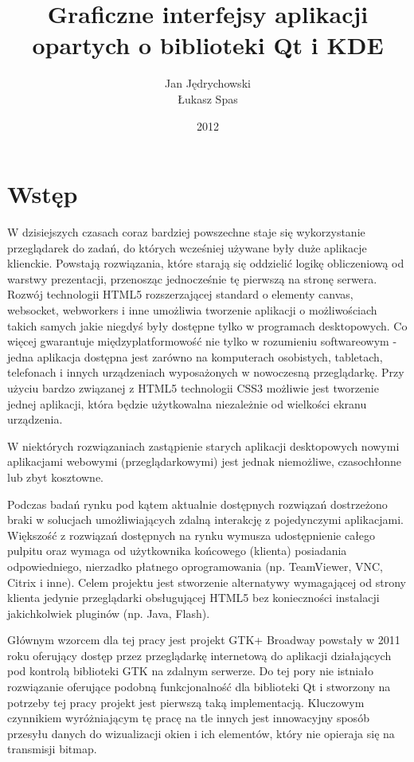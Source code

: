 \documentclass[polish]{inz}
\title{Graficzne interfejsy aplikacji opartych o biblioteki Qt i KDE}
\author{Jan J\k{e}drychowski\\\L{}ukasz Spas}
\date{2012}
\begin{document}
\maketitle

\chapter{Wstęp}

W dzisiejszych czasach coraz bardziej powszechne staje się wykorzystanie przeglądarek do zadań, do których wcześniej używane były duże aplikacje klienckie. Powstają rozwiązania, które starają się oddzielić logikę obliczeniową od warstwy prezentacji, przenosząc jednocześnie tę pierwszą na stronę serwera. Rozwój technologii HTML5 rozszerzającej standard o elementy canvas, websocket, webworkers i inne umożliwia tworzenie aplikacji o możliwościach takich samych jakie niegdyś były dostępne tylko w programach desktopowych. Co więcej gwarantuje międzyplatformowość nie tylko w rozumieniu softwareowym - jedna aplikacja dostępna jest zarówno na komputerach osobistych, tabletach, telefonach i innych urządzeniach wyposażonych w nowoczesną przeglądarkę. Przy użyciu bardzo związanej z HTML5 technologii CSS3 możliwie jest tworzenie jednej aplikacji, która będzie użytkowalna niezależnie od wielkości ekranu urządzenia.

W niektórych rozwiązaniach zastąpienie starych aplikacji desktopowych nowymi aplikacjami webowymi (przeglądarkowymi) jest jednak niemożliwe, czasochłonne lub zbyt kosztowne.

Podczas badań rynku pod kątem aktualnie dostępnych rozwiązań dostrzeżono braki w solucjach umożliwiających zdalną interakcję z pojedynczymi aplikacjami. Większość z rozwiązań dostępnych na rynku wymusza udostępnienie całego pulpitu oraz wymaga od użytkownika końcowego (klienta) posiadania odpowiedniego, nierzadko płatnego oprogramowania (np. TeamViewer, VNC, Citrix i inne). Celem projektu jest stworzenie alternatywy wymagającej od strony klienta jedynie przeglądarki obsługującej HTML5 bez konieczności instalacji jakichkolwiek pluginów (np. Java, Flash).

Głównym wzorcem dla tej pracy jest projekt GTK+ Broadway powstały w 2011 roku oferujący dostęp przez przeglądarkę internetową do aplikacji działających pod kontrolą biblioteki GTK na zdalnym serwerze. Do tej pory nie istniało rozwiązanie oferujące podobną funkcjonalność dla biblioteki Qt i stworzony na potrzeby tej pracy projekt jest pierwszą taką implementacją. Kluczowym czynnikiem wyróżniającym tę pracę na tle innych jest innowacyjny sposób przesyłu danych do wizualizacji okien i ich elementów, który nie opieraja się na transmisji bitmap.
\end{document}
